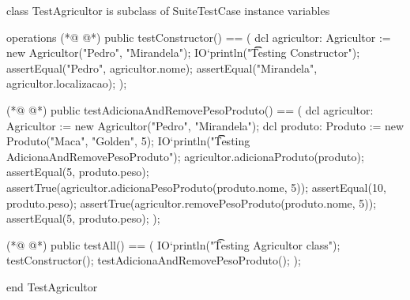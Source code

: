 \begin{vdmpp}[breaklines=true]
class TestAgricultor is subclass of SuiteTestCase
instance variables
 
operations
(*@
\label{testConstructor:5}
@*)
  public testConstructor() == (
   dcl agricultor: Agricultor := new Agricultor("Pedro", "Mirandela");
    IO`println("\t\t Testing Constructor");
    assertEqual("Pedro", agricultor.nome);
    assertEqual("Mirandela", agricultor.localizacao);
  );
  
(*@
\label{testAdicionaAndRemovePesoProduto:12}
@*)
 public testAdicionaAndRemovePesoProduto() == (
  dcl agricultor: Agricultor := new Agricultor("Pedro", "Mirandela");
   dcl produto: Produto := new Produto("Maca", "Golden", 5);
  IO`println("\t\t Testing AdicionaAndRemovePesoProduto");
  agricultor.adicionaProduto(produto);
  assertEqual(5, produto.peso);  
  assertTrue(agricultor.adicionaPesoProduto(produto.nome, 5));
  assertEqual(10, produto.peso);  
  assertTrue(agricultor.removePesoProduto(produto.nome, 5));
  assertEqual(5, produto.peso);  
  );
   
(*@
\label{testAll:24}
@*)
  public testAll() == (
    IO`println("\t Testing Agricultor class");
    testConstructor();
    testAdicionaAndRemovePesoProduto();
  );

end TestAgricultor
\end{vdmpp}
